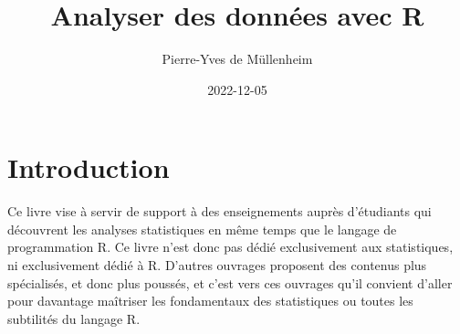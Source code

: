 \documentclass[
  french,
]{book}
\title{Analyser des données avec R}
\author{Pierre-Yves de Müllenheim}
\date{2022-12-05}
\begin{document}
\maketitle

\renewcommand*\contentsname{Sommaire}
{
\setcounter{tocdepth}{1}
\tableofcontents
}
\renewcommand{\listfigurename}{Liste des figures}
\renewcommand{\figurename}{Figure}
\renewcommand{\tablename}{Tableau}

\listoftables

\listoffigures

\hypertarget{introduction}{%
\chapter*{Introduction}\label{introduction}}

Ce livre vise à servir de support à des enseignements auprès d'étudiants qui découvrent les analyses statistiques en même temps que le langage de programmation R. Ce livre n'est donc pas dédié exclusivement aux statistiques, ni exclusivement dédié à R. D'autres ouvrages proposent des contenus plus spécialisés, et donc plus poussés, et c'est vers ces ouvrages qu'il convient d'aller pour davantage maîtriser les fondamentaux des statistiques ou toutes les subtilités du langage R.
\end{document}
